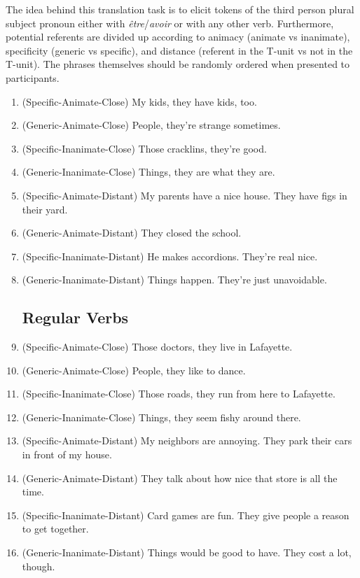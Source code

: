 The idea behind this translation task is to elicit tokens of the third person plural subject pronoun either with \emph{être}/\emph{avoir} or with any other verb. Furthermore, potential referents are divided up according to animacy (animate vs inanimate), specificity (generic vs specific), and distance (referent in the T-unit vs not in the T-unit). The phrases themselves should be randomly ordered when presented to participants.

\begin{enumerate}
    \subsection{\emph{être}/\emph{avoir}}
        \item (Specific-Animate-Close) My kids, they have kids, too.
        \item (Generic-Animate-Close) People, they're strange sometimes.

        \item (Specific-Inanimate-Close) Those cracklins, they're good.
        \item (Generic-Inanimate-Close) Things, they are what they are.

        \item (Specific-Animate-Distant) My parents have a nice house. They have figs in their yard.
        \item (Generic-Animate-Distant) They closed the school.

        \item (Specific-Inanimate-Distant) He makes accordions. They're real nice.
        \item (Generic-Inanimate-Distant) Things happen. They're just unavoidable.
    \subsection{Regular Verbs}
        \item (Specific-Animate-Close) Those doctors, they live in Lafayette.
        \item (Generic-Animate-Close) People, they like to dance.

        \item (Specific-Inanimate-Close) Those roads, they run from here to Lafayette.
        \item (Generic-Inanimate-Close) Things, they seem fishy around there.

        \item (Specific-Animate-Distant) My neighbors are annoying. They park their cars in front of my house.
        \item (Generic-Animate-Distant) They talk about how nice that store is all the time.

        \item (Specific-Inanimate-Distant) Card games are fun. They give people a reason to get together.
        \item (Generic-Inanimate-Distant) Things would be good to have. They cost a lot, though.
\end{enumerate}

